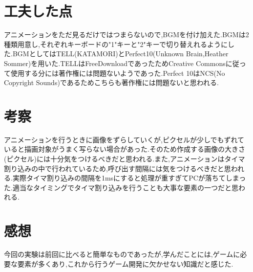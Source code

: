 \documentclass{jarticle}
\begin{document}
	\section{工夫した点}
	アニメーションをただ見るだけではつまらないので,BGMを付け加えた.BGMは2種類用意し,それぞれキーボードの"1"キーと"2"キーで切り替えれるようにした.BGMとしてはTELL(KATAMORI)とPerfect10(Unknown Brain,Heather Sommer)を用いた.TELLはFreeDownloadであったためCreative Commonsに従って使用する分には著作権には問題ないようであった.Perfect 10はNCS(No Copyright Sounds)であるためこちらも著作権には問題ないと思われる.
	\section{考察}
	アニメーションを行うときに画像をずらしていくが,ピクセルが少しでもずれていると描画対象がうまく写らない場合があった.そのため作成する画像の大きさ(ピクセル)には十分気をつけるべきだと思われる.また,アニメーションはタイマ割り込みの中で行われているため,呼び出す間隔には気をつけるべきだと思われる.実際タイマ割り込みの間隔を1msにすると処理が重すぎてPCが落ちてしまった.適当なタイミングでタイマ割り込みを行うことも大事な要素の一つだと思われる.
	\section{感想}
	今回の実験は前回に比べると簡単なものであったが,学んだことには,ゲームに必要な要素が多くあり,これから行うゲーム開発に欠かせない知識だと感じた.
\end{document}

